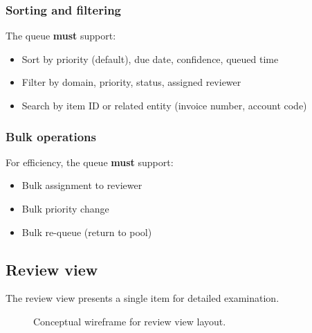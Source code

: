 \documentclass[11pt,a4paper,twoside]{report}
\begin{document}
\subsubsection{Sorting and filtering}

The queue \textbf{must} support:
\begin{itemize}
\item Sort by priority (default), due date, confidence, queued time
\item Filter by domain, priority, status, assigned reviewer
\item Search by item ID or related entity (invoice number, account code)
\end{itemize}

\subsubsection{Bulk operations}

For efficiency, the queue \textbf{must} support:
\begin{itemize}
\item Bulk assignment to reviewer
\item Bulk priority change
\item Bulk re-queue (return to pool)
\end{itemize}

\subsection{Review view}

The review view presents a single item for detailed examination.

\begin{figure}[htbp]
\centering
{}
\caption{Conceptual wireframe for review view layout.}
\label{fig:review-wireframe}
\end{figure}
\end{document}
